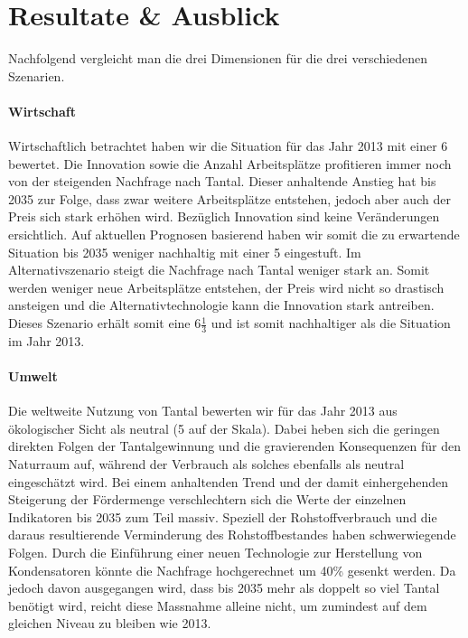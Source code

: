 \section{Resultate \& Ausblick}\label{sec:conflict}

Nachfolgend vergleicht man die drei Dimensionen für die drei verschiedenen Szenarien.

\paragraph{Wirtschaft}
Wirtschaftlich betrachtet haben wir die Situation für das Jahr 2013 mit einer 6
bewertet. Die Innovation sowie die Anzahl Arbeitsplätze profitieren immer noch von
der steigenden Nachfrage nach Tantal. Dieser anhaltende Anstieg hat bis 2035 zur Folge,
dass zwar weitere Arbeitsplätze entstehen, jedoch aber auch der Preis sich stark erhöhen
wird. Bezüglich Innovation sind keine Veränderungen ersichtlich. Auf aktuellen Prognosen
basierend haben wir somit die zu erwartende Situation bis 2035 weniger nachhaltig mit einer 5 eingestuft.
Im Alternativszenario steigt die Nachfrage nach Tantal weniger stark an. Somit werden
weniger neue Arbeitsplätze entstehen, der Preis wird nicht so drastisch ansteigen
und die Alternativtechnologie kann die Innovation stark antreiben. Dieses Szenario
erhält somit eine 6\(\frac{1}{3}\) und ist somit nachhaltiger als die Situation
im Jahr 2013.

\paragraph{Umwelt}
Die weltweite Nutzung von Tantal bewerten wir für das Jahr 2013 aus ökologischer
Sicht als neutral (5 auf der Skala). Dabei heben sich die geringen direkten
Folgen der Tantalgewinnung und die gravierenden Konsequenzen für den Naturraum
auf, während der Verbrauch als solches ebenfalls als neutral eingeschätzt wird.
Bei einem anhaltenden Trend und der damit einhergehenden Steigerung der
Fördermenge verschlechtern sich die Werte der einzelnen Indikatoren bis 2035 zum
Teil massiv. Speziell der Rohstoffverbrauch und die daraus resultierende
Verminderung des Rohstoffbestandes haben schwerwiegende Folgen. Durch die
Einführung einer neuen Technologie zur Herstellung von Kondensatoren könnte die
Nachfrage hochgerechnet um 40\% gesenkt werden. Da jedoch davon ausgegangen
wird, dass bis 2035 mehr als doppelt so viel Tantal benötigt wird, reicht
diese Massnahme alleine nicht, um zumindest auf dem gleichen Niveau zu bleiben
wie 2013. 

